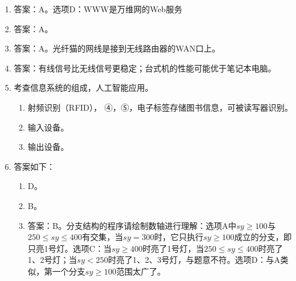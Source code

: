 \begin{enumerate}
\item 答案：A。选项D：WWW是万维网的Web服务

\item 答案：A。

\item 答案：A。光纤猫的网线是接到无线路由器的WAN口上。

\item 答案：有线信号比无线信号更稳定；台式机的性能可能优于笔记本电脑。

\item 考查信息系统的组成，人工智能应用。
	\begin{enumerate}[label=$(\arabic*)$]
	\item 射频识别（RFID）， ④，⑤，电子标签存储图书信息，可被读写器识别。
	\item 输入设备。
	\item 输出设备。
	\end{enumerate}

\item 答案如下：
	\begin{enumerate}[label=$(\arabic*)$]
	\item D。
	\item B。
	\item 答案：B。分支结构的程序请绘制数轴进行理解：选项A中$sy \ge 100$与$250 \le sy \le 400$有交集，当$sy=300$时，它只执行$sy \ge 100$成立的分支，即只亮1号灯。选项C：当$sy \ge 400$时亮了1号灯，当$250 \le sy \le 400$时亮了1、2号灯；当$sy < 250$时亮了1、2、3号灯，与题意不符。选项D：与A类似，第一个分支$sy \ge 100$范围太广了。
	\end{enumerate}


\end{enumerate}
